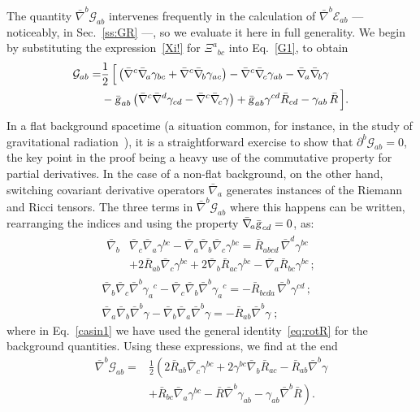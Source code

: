 \documentclass[a4paper,showkeys,aps,prd,reprint,nofootinbib,showpacs,twocolumn]{revtex4-1}
\newcommand{\pd}{\partial}
\newcommand{\ton}[1]{\left(#1\right)}
\newcommand{\eq}[1]{\( #1 \)}
\newcommand{\speq}[1]{\begin{equation}\begin{split}#1\end{split}\end{equation}}
\newcommand{\gat}[1]{\begin{gather} #1 \end{gather}}
\newcommand{\Cal}[1]{\mathcal{#1}}
\newcommand{\matg}{\text{\textsl{g}}}%
\theoremstyle{plain}
\begin{document}
The quantity \eq{\bar{\nabla}^b \Cal{G}_{ab}} intervenes frequently in the calculation of \eq{\bar{\nabla}^b \Cal{E}_{ab}} --- noticeably, in Sec.~\ref{ss:GR} ---, so we evaluate it here in full generality.  We begin by substituting the expression~\eqref{Xi!} for \eq{{\Xi^a}_{bc}} into Eq.~\eqref{G1}, to obtain
%
\speq{\Cal{G}_{a b} = &\frac{1}{2} \, \Big[\ton{\bar{\nabla}^c \bar{\nabla}_{\! a} \gamma_{b c} + \bar{\nabla}^c \bar{\nabla}_{\! b} \gamma_{a c}} - \bar{\nabla}^c \bar{\nabla}_{\! c} \gamma_{a b} - \bar{\nabla}_{\! a} \bar{\nabla}_{\! b} \gamma \\
&- \bar{\matg}_{a b} \ton{\bar{\nabla}^c \bar{\nabla}^d \gamma_{c d} - \bar{\nabla}^c \bar{\nabla}_{\! c} \gamma} + \bar{\matg}_{ab} \gamma^{cd} \bar{R}_{cd} - \gamma_{ab} \, \bar{R}\,\Big]. \label{eq:calligrG}}
%
In a flat background spacetime (a situation common, for instance, in the study of gravitational radiation~\cite{Wald:1984rg}), it is a straightforward exercise to show that \eq{\pd^b \Cal{G}_{ab} = 0}, the key point in the proof being a heavy use of the commutative property for partial derivatives.  In the case of a non-flat background, on the other hand, switching covariant derivative operators \eq{\bar{\nabla}_{\! a}} generates instances of the Riemann and Ricci tensors.  The three terms in \eq{\bar{\nabla}^b \Cal{G}_{ab}} where this happens can be written, rearranging the indices and using the property \eq{\bar{\nabla}_{\! a} \bar{\matg}_{cd} = 0}, as:
%
\gat{\begin{split}\bar{\nabla}_{\! b} &\bar{\nabla}_{\! c} \bar{\nabla}_{\! a} \gamma^{bc} - \bar{\nabla}_{\! a} \bar{\nabla}_{\! b} \bar{\nabla}_{\! c} \gamma^{bc} = \bar{R}_{abcd} \, \bar{\nabla}^d \gamma^{bc} \\
&+2 \bar{R}_{ab} \bar{\nabla}_{\! c} \gamma^{bc} + 2 \bar{\nabla}_{\! b} \bar{R}_{ac} \gamma^{bc} - \bar{\nabla}_{\! a} \bar{R}_{bc} \gamma^{bc} \,; \label{casin1} \end{split} \\[1em]
\bar{\nabla}_{\! b} \bar{\nabla}_{\! c} \bar{\nabla}^b {\gamma_a}^c-\bar{\nabla}_{\! c}\bar{\nabla}_{\! b}\bar{\nabla}^b{\gamma_a}^c = - \bar{R}_{bcda} \, \bar{\nabla}^b \gamma^{cd} \,; \label{casin2} \\[1em]
\bar{\nabla}_{\! a}\bar{\nabla}_{\! b}\bar{\nabla}^b\gamma-\bar{\nabla}_{\! b}\bar{\nabla}_{\! a}\bar{\nabla}^b\gamma=-\bar{R}_{ab}\bar{\nabla}^b\gamma\;;
\label{casin3}}
%
where in Eq.~\eqref{casin1} we have used the general identity~\eqref{eq:rotR} for the background quantities.  Using these expressions, we find at the end
%
\speq{\bar{\nabla}^b \Cal{G}_{ab} = &\frac{1}{2} \left( 2 \bar{R}_{ab} \bar{\nabla}_{\! c}\gamma^{bc} + 2 \gamma^{bc} \bar{\nabla}_{\! b}\bar{R}_{ac} - \bar{R}_{ab} \bar{\nabla}^b \gamma \right. \\[0.5em]
&\left. + \bar{R}_{bc} \bar{\nabla}_{\! a} \gamma^{bc} - \bar{R} \bar{\nabla}^b \gamma_{ab} - \gamma_{ab} \bar{\nabla}^b \bar{R} \right).
\label{divG1}}
%
\end{document}
